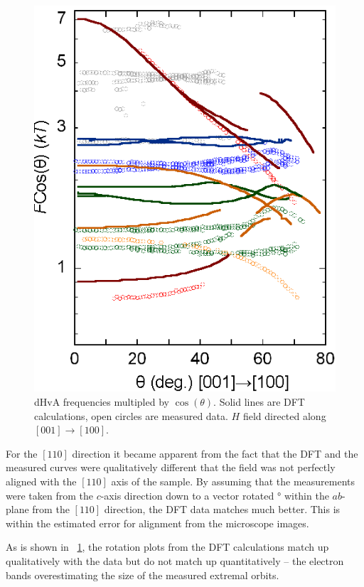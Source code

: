 {{{\begin{figure}
\begin{center}
        \includegraphics[scale=0.7]{Chapter3-dHvABaFe2P2/Figures/AngleDepMeasurements/AngleSweepMeasuredUnshifted/AngleSweepMeasuredUnshifted}
        \caption{dHvA frequencies multipled by $\cos(\theta)$. Solid lines are DFT calculations, open circles are measured data. $H$ field directed along $[001]\rightarrow[100]$.}
        \label{Fig:3:AngleSweepMeasuredUnshifted}
    \end{center}
\end{figure}

For the $[110]$ direction it became apparent from the fact that the DFT and the measured curves were qualitatively different that the field was not perfectly aligned with the $[110]$ axis of the sample. By assuming that the measurements were taken from the $c$-axis direction down to a vector rotated \unit[10]{\degree} within the $ab$-plane from the $[110]$ direction, the DFT data matches much better. This is within the estimated error for alignment from the microscope images.

As is shown in \fig~\ref{Fig:3:AngleSweepMeasuredUnshifted}, the rotation plots from the DFT calculations match up qualitatively with the data but do not match up quantitatively -- the electron bands overestimating the size of the measured extremal orbits. 

}}}
